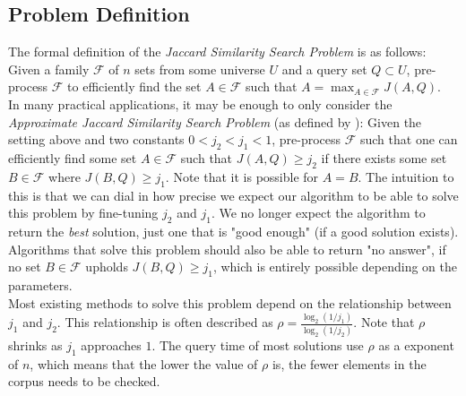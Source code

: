 \subsection{Problem Definition}
The formal definition of the \textit{Jaccard Similarity Search Problem} is as follows:
Given a family $\mathcal{F}$ of $n$ sets from some universe $U$ and a query set $Q\subset U$, pre-process $\mathcal{F}$ to efficiently find the set $A\in \mathcal{F}$ such that $A = \max_{A\in \mathcal{F}}J(A,Q)$. \\
In many practical applications, it may be enough to only consider the \textit{Approximate Jaccard Similarity Search Problem} (as defined by \citet{fast-similarity-search}): Given the setting above and two constants $0 < j_2 < j_1 < 1$, pre-process $\mathcal{F}$ such that one can efficiently find some set $A \in \mathcal{F}$ such that $J(A,Q) \geq j_2$ if there exists some set $B \in \mathcal{F}$ where $J(B,Q) \geq j_1$. Note that it is possible for $A = B$. The intuition to this is that we can dial in how precise we expect our algorithm to be able to solve this problem by fine-tuning $j_2$ and $j_1$. We no longer expect the algorithm to return the \textit{best} solution, just one that is "good enough" (if a good solution exists). Algorithms that solve this problem should also be able to return "no answer", if no set $B\in \mathcal{F}$ upholds $J(B,Q)\geq j_1$, which is entirely possible depending on the parameters. \\
Most existing methods to solve this problem depend on the relationship between $j_1$ and $j_2$. This relationship is often described as $\rho=\frac{\log_2(1/j_1)}{\log_2(1/j_2)}$. Note that $\rho$ shrinks as $j_1$ approaches $1$. The query time of most solutions use $\rho$ as a exponent of $n$, which means that the lower the value of $\rho$ is, the fewer elements in the corpus needs to be checked.

